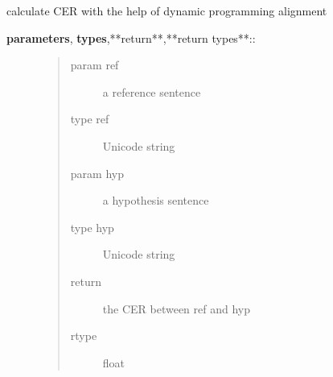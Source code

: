 \documentclass[letterpaper,10pt,english]{sphinxmanual}
\begin{document}
\begin{fulllineitems}
\label{API:norm.util.calculate_cer}
calculate CER with the help of dynamic programming alignment
\begin{description}
\item[{\textbf{parameters}, \textbf{types},**return**,**return types**::}] \leavevmode\begin{quote}\begin{description}
\item[{param ref}] \leavevmode
a reference sentence

\item[{type ref}] \leavevmode
Unicode string

\item[{param hyp}] \leavevmode
a hypothesis sentence

\item[{type hyp}] \leavevmode
Unicode string

\item[{return}] \leavevmode
the CER between ref and hyp

\item[{rtype}] \leavevmode
float

\end{description}\end{quote}

\end{description}

\end{fulllineitems}

\end{document}
